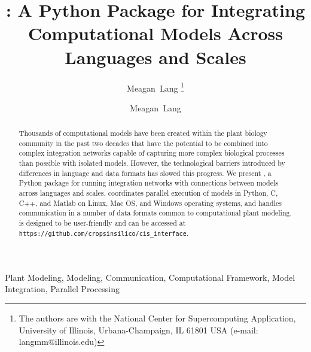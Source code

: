 \documentclass[journal]{IEEEtran}
\newcommand{\todo}[1]{{\color{red}{#1}}}
\newcommand{\pkg}{{\tt \todo{cis\_interface}}{}}
\begin{document}
\ifieee
\else
	\shorttitle{{\pkg}}
\fi

\title{{\pkg}: A Python Package for Integrating Computational Models Across Languages and Scales}

\ifieee
	\author{Meagan~Lang%
	\thanks{The authors are with the National Center for Supercomputing Application, University of Illinois, Urbana-Champaign, IL 61801 USA (e-mail: langmm@illinois.edu)}}
\else
	\author{Meagan~Lang}

\fi


\ifieee
	\maketitle
\fi

\begin{abstract}
Thousands of computational models have been created within the plant biology community in the past two decades that have the potential to be combined into complex integration networks capable of capturing more complex biological processes than possible with isolated models. However, the technological barriers introduced by differences in language and data formats has slowed this progress. We present \href{https://github.com/cropsinsilico/cis_interface}{\pkg}, a Python package for running integration networks with connections between models across languages and scales. {\pkg} coordinates parallel execution of models in Python, C, C++, and Matlab on Linux, Mac OS, and Windows operating systems, and handles communication in a number of data formats common to computational plant modeling. {\pkg} is designed to be user-friendly and can be accessed at {\tt https://github.com/cropsinsilico/cis\_interface}.
\end{abstract}

\ifieee
	\begin{IEEEkeywords}
		Plant Modeling, Modeling, Communication, Computational Framework, Model Integration, Parallel Processing
	\end{IEEEkeywords}
	\IEEEpeerreviewmaketitle
\else
	\maketitle
\fi

\end{document}

